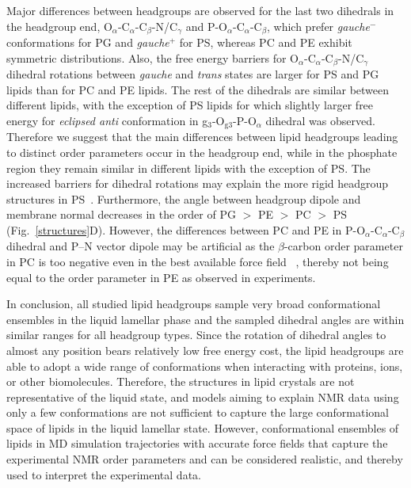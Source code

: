 \documentclass[journal=jpcbfk,manuscript=article]{achemso}
\begin{document}
Major differences between headgroups are observed for the last two dihedrals in the headgroup end,
O$_\alpha$-C$_\alpha$-C$_\beta$-N/C$_\gamma$ and P-O$_\alpha$-C$_\alpha$-C$_\beta$,
which prefer \textit{gauche$^-$} conformations for PG and \textit{gauche$^+$} for PS,
whereas PC and PE exhibit symmetric distributions.
Also, the free energy barriers for O$_\alpha$-C$_\alpha$-C$_\beta$-N/C$_\gamma$ dihedral
rotations between \textit{gauche} and \textit{trans} states are larger for
PS and PG lipids than for PC and PE lipids. 
The rest of the dihedrals are similar between different lipids,
with the exception of PS lipids for which slightly larger free energy for \textit{eclipsed anti} conformation
in g$_3$-O$_{{\mathrm g}3}$-P-O$_\alpha$ dihedral was observed.
Therefore we suggest that the main differences between lipid headgroups leading to distinct order parameters occur in the headgroup end, while in the phosphate region they remain similar in different lipids with the exception of PS. The increased barriers for dihedral rotations may explain the more rigid headgroup structures in PS~\cite{browning80,buldt81}. Furthermore, the angle between headgroup dipole and membrane normal decreases in the order of PG $>$ PE  $>$ PC  $>$ PS (Fig.~\ref{structures}D). However, the differences between PC and PE in P-O$_\alpha$-C$_\alpha$-C$_\beta$ dihedral
and P--N vector dipole may be artificial as the $\beta$-carbon order parameter in PC is too negative even in the best available force field~ \cite{botan15}, thereby not being equal to the order parameter in PE as observed in experiments.

In conclusion, all studied lipid headgroups sample very broad conformational ensembles in the liquid lamellar phase and the sampled dihedral angles are within similar ranges for all headgroup types.
Since the rotation of dihedral angles to almost any position bears relatively low free energy cost, the lipid headgroups are able to adopt a wide range of conformations when interacting with proteins, ions, or other biomolecules.
Therefore, the structures in lipid crystals \cite{buldt81,pascher92} are not representative of the liquid state, and models aiming to explain NMR data using only a few conformations \cite{seelig77c,davis83,Semchyschyn04,akutsu20} are not sufficient to capture the large conformational space of lipids in the liquid lamellar state.
However, conformational ensembles of lipids in MD simulation trajectories with accurate force fields that capture the experimental NMR order parameters and can be considered realistic, and thereby used to interpret the experimental data.
\end{document}
